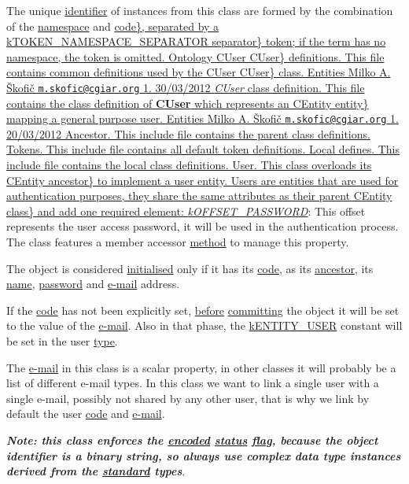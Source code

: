 The unique \hyperlink{}{identifier} of instances from this class are formed by the combination of the \hyperlink{}{namespace} and \hyperlink{}{code\}, separated by a  k\-T\-O\-K\-E\-N\-\_\-\-N\-A\-M\-E\-S\-P\-A\-C\-E\-\_\-\-S\-E\-P\-A\-R\-A\-T\-O\-R separator\} token; if the term has no namespace, the token is omitted.   Ontology   C\-User C\-User\} definitions.  This file contains common definitions used by the  C\-User C\-User\} class.   Entities   Milko A. Škofič \href{mailto:m.skofic@cgiar.org}{\tt m.\-skofic@cgiar.\-org}  1. 30/03/2012  {\itshape C\-User} class definition.  This file contains the class definition of {\bfseries C\-User} which represents an  C\-Entity entity\} mapping a general purpose user.   Entities   Milko A. Škofič \href{mailto:m.skofic@cgiar.org}{\tt m.\-skofic@cgiar.\-org}  1. 20/03/2012  Ancestor.  This include file contains the parent class definitions. Tokens.  This include file contains all default token definitions. Local defines.  This include file contains the local class definitions. User.  This class overloads its  C\-Entity ancestor\} to implement a user entity.  Users are entities that are used for authentication purposes, they share the same attributes as their parent  C\-Entity class\} and add one required element\-:  } {\itshape \hyperlink{}{k\-O\-F\-F\-S\-E\-T\-\_\-\-P\-A\-S\-S\-W\-O\-R\-D}}\-: This offset represents the user access password, it will be used in the authentication process. The class features a member accessor \hyperlink{}{method} to manage this property. 

The object is considered \hyperlink{}{initialised} only if it has its \hyperlink{}{code}, as its \hyperlink{class_c_entity}{ancestor}, its \hyperlink{}{name}, \hyperlink{}{password} and \hyperlink{}{e-\/mail} address.

If the \hyperlink{}{code} has not been explicitly set, \hyperlink{}{before} \hyperlink{}{committing} the object it will be set to the value of the \hyperlink{}{e-\/mail}. Also in that phase, the \hyperlink{}{k\-E\-N\-T\-I\-T\-Y\-\_\-\-U\-S\-E\-R} constant will be set in the user \hyperlink{}{type}.

The \hyperlink{}{e-\/mail} in this class is a scalar property, in other classes it will probably be a list of different e-\/mail types. In this class we want to link a single user with a single e-\/mail, possibly not shared by any other user, that is why we link by default the user \hyperlink{}{code} and \hyperlink{}{e-\/mail}.

{\itshape {\bfseries Note\-: this class enforces the \hyperlink{}{encoded} \hyperlink{}{status} \hyperlink{}{flag}, because the object identifier is a binary string, so always use complex data type instances derived from the \hyperlink{class_c_data_type}{standard} types}}.

